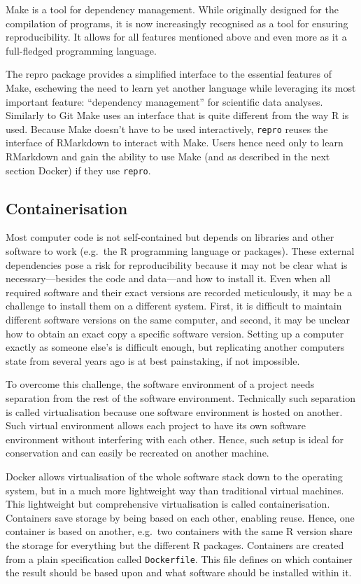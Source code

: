 \documentclass[12pt,a4paper,twoside]{article}
\begin{document}
Make is a tool for dependency management.
While originally designed for the compilation of programs, it is now increasingly recognised as a tool for ensuring reproducibility.
It allows for all features mentioned above and even more as it a full-fledged programming language.

The repro package provides a simplified interface to the essential features of Make, eschewing the need to learn yet another language while leveraging its most important feature: ``dependency management'' for scientific data analyses. Similarly to Git Make uses an interface that is quite different from the way R is used.
Because Make doesn't have to be used interactively, \texttt{repro} reuses the interface of RMarkdown to interact with Make.
Users hence need only to learn RMarkdown and gain the ability to use Make (and as described in the next section Docker) if they use \texttt{repro}.

\hypertarget{containerisation}{%
\subsection{Containerisation}\label{containerisation}}

Most computer code is not self-contained but depends on libraries and other software to work (e.g.~the R programming language or packages).
These external dependencies pose a risk for reproducibility because it may not be clear what is necessary---besides the code and data---and how to install it.
Even when all required software and their exact versions are recorded meticulously, it may be a challenge to install them on a different system.
First, it is difficult to maintain different software versions on the same computer, and second, it may be unclear how to obtain an exact copy a specific software version.
Setting up a computer exactly as someone else's is difficult enough, but replicating another computers state from several years ago is at best painstaking, if not impossible.

To overcome this challenge, the software environment of a project needs separation from the rest of the software environment. Technically such separation is called virtualisation because one software environment is hosted on another. Such virtual environment allows each project to have its own software environment without interfering with each other. Hence, such setup is ideal for conservation and can easily be recreated on another machine.

Docker allows virtualisation of the whole software stack down to the operating system, but in a much more lightweight way than traditional virtual machines. This lightweight but comprehensive virtualisation is called containerisation. Containers save storage by being based on each other, enabling reuse. Hence, one container is based on another, e.g.~two containers with the same R version share the storage for everything but the different R packages. Containers are created from a plain specification called \texttt{Dockerfile}. This file defines on which container the result should be based upon and what software should be installed within it.
\end{document}
